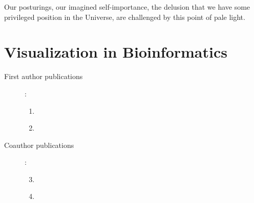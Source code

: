 \begin{savequote}[75mm] 
Our posturings, our imagined self-importance, the delusion that we have some privileged position in the Universe, are challenged by this point of pale light.
\end{savequote}

\chapter{Visualization in Bioinformatics} \label{section:visualization}




\begin{description}
	\item[First author publications]:\\
		\begin{enumerate}
			\item \label{paper:PPI} 
			\item  \label{paper:PINV} 
		\end{enumerate}

	\item[Coauthor publications]:\\
		\begin{enumerate}
			\setcounter{enumi}{2}
			\item \label{paper:biojs1} 
			\item \label{paper:biojs2} 
		\end{enumerate}
 

\end{description}
